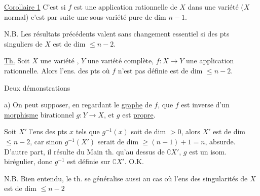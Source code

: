 
\uline{Corollaire 1}   C'est  si $f$ est une application rationnelle de $X$ dans une variété  ($X$ normal) c'est par suite une sous-variété pure de dim $n-1$.

 N.B. Les résultats précédents valent sans changement essentiel si   des pts singuliers de $X$ est de dim $\leq n-2$.

\uline{Th.} Soit $X$ une variété , $Y$  une variété complète, $f:X\longrightarrow Y$ une application rationnelle. Alors l'ens. des pts où $f$ n'est pas définie est de dim $\leq n-2$.

 Deux démonstrations

a) On peut supposer, en regardant le \uline{graphe} de $f$, que $f$ est inverse d'un \uline{morphisme} birationnel $g:Y\longrightarrow X$, et $g$ est  \uline{propre}.

 Soit $X'$ l'ens des pts $x$  tels que $g^{-1}(x)$ soit de dim $>0$, alors $X'$ est de dim $\leq n-2$, car sinon $g^{-1}(X')$ serait de dim $\geq(n-1)+1=n$, absurde.  D'autre part, il résulte du Main th. qu'au dessus de $\complement X'$, $g$ est un isom. birégulier, donc $g^{-1}$ est définie sur $\complement X'$. O.K.

N.B. Bien entendu, le th. se généralise aussi au cas où  l'ens des singularités de $X$ est de dim $\leq n-2$


